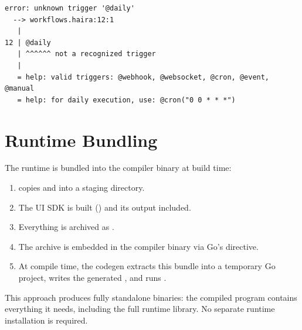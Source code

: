 \begin{lstlisting}[language={},numbers=none]
error: unknown trigger '@daily'
  --> workflows.haira:12:1
   |
12 | @daily
   | ^^^^^^ not a recognized trigger
   |
   = help: valid triggers: @webhook, @websocket, @cron, @event, @manual
   = help: for daily execution, use: @cron("0 0 * * *")
\end{lstlisting}

\section{Runtime Bundling}

The runtime is bundled into the compiler binary at build time:

\begin{enumerate}
    \item {} copies  and  into a staging directory.
    \item The UI SDK is built () and its output included.
    \item Everything is archived as .
    \item The archive is embedded in the compiler binary via Go's  directive.
    \item At compile time, the codegen extracts this bundle into a temporary Go project, writes the generated , and runs .
\end{enumerate}

This approach produces fully standalone binaries: the compiled \haira{} program contains everything it needs, including the full runtime library. No separate runtime installation is required.
